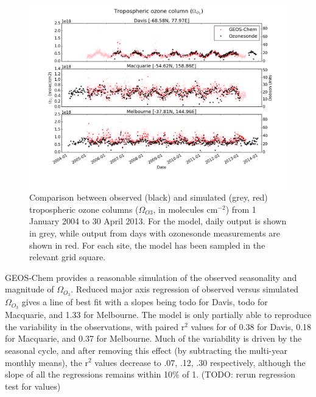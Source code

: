 \documentclass{article}
\begin{document}
  \begin{figure}[!htbp]
    \includegraphics[width=\textwidth]{figures/StationSeries.png}
    \caption{Comparison between observed (black) and simulated (grey, red) tropospheric ozone columns ($\Omega_{O3}$, in molecules cm$^{-2}$) from 1 January 2004 to 30 April 2013.
    For the model, daily output is shown in grey, while output from days with ozonesonde measurements are shown in red.
    For each site, the model has been sampled in the relevant grid square.}
    \label{fig:StationSeriesGEOSChem}
  \end{figure}
  
  GEOS-Chem provides a reasonable simulation of the observed seasonality and magnitude of $\Omega_{O_3}$. Reduced major axis regression of observed versus simulated $\Omega_{O_3}$ gives a line of best fit with a slopes being todo for Davis, todo for Macquarie, and 1.33 for Melbourne.
  The model is only partially able to reproduce the variability in the observations, with paired r$^2$ values for of 0.38 for Davis, 0.18 for Macquarie, and 0.37 for Melbourne.
  Much of the variability is driven by the seasonal cycle, and after removing this effect (by subtracting the multi-year monthly means), the r$^2$ values decrease to .07, .12, .30 respectively, although the slope of all the regressions remains within 10\% of 1. (TODO: rerun regression test for values)
  
\end{document}
